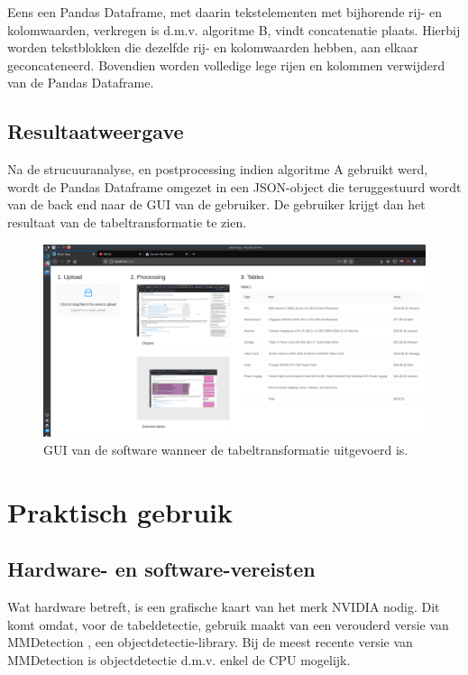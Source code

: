 Eens een Pandas Dataframe, met daarin tekstelementen met bijhorende rij- en kolomwaarden, verkregen is d.m.v. algoritme B, vindt concatenatie plaats. Hierbij worden tekstblokken die dezelfde rij- en kolomwaarden hebben, aan elkaar geconcateneerd. Bovendien worden volledige lege rijen en kolommen verwijderd van de Pandas Dataframe.

\subsection{Resultaatweergave}
\label{subsec:resultaat-weergave}

Na de strucuuranalyse, en postprocessing indien algoritme A gebruikt werd, wordt de Pandas Dataframe omgezet in een JSON-object die teruggestuurd wordt van de back end naar de GUI van de gebruiker. De gebruiker krijgt dan het resultaat van de tabeltransformatie te zien.

\begin{figure}[H]
    \centering
    \includegraphics[width=1\textwidth]{img/gui_screenshot_used.png}
    \caption{GUI van de software wanneer de tabeltransformatie uitgevoerd is.}
    \label{fig:gui-screenshot-used}
\end{figure}

\section{Praktisch gebruik}
\label{sec:praktisch-gebruik}

\subsection{Hardware- en software-vereisten}
\label{subsec:hardware-en-software-vereisten}

Wat hardware betreft, is een grafische kaart van het merk NVIDIA nodig. Dit komt omdat, voor de tabeldetectie, \textcite{Prasad2020} gebruik maakt van een verouderd versie van MMDetection \autocite{Chen2019}, een objectdetectie-library. Bij de meest recente versie van MMDetection is objectdetectie d.m.v. enkel de CPU mogelijk. 

